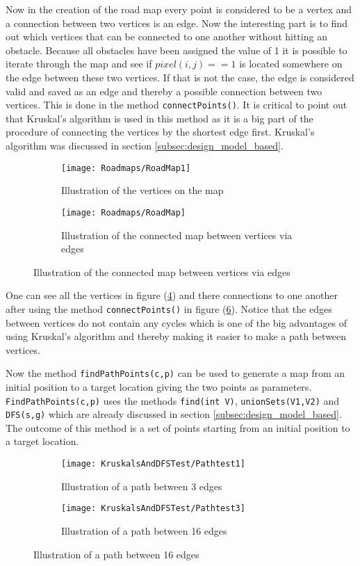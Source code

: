 \documentclass[../Head/Main.tex]{subfiles}
\begin{document}
Now in the creation of the road map every point is considered to be a vertex and a connection between two vertices is an edge. Now the interesting part is to find out which vertices that can be connected to one another without hitting an obstacle. Because all obstacles have been assigned the value of 1 it is possible to iterate through the map and see if $pixel(i,j) == 1$ is located somewhere on the edge between these two vertices. If that is not the case, the edge is considered valid and saved as an edge and thereby a possible connection between two vertices. This is done in the method \texttt{connectPoints()}. It is critical to point out that Kruskal's algorithm is used in this method as it is a big part of the procedure of connecting the vertices by the shortest edge first. Kruskal's algorithm was discussed in section \ref{subsec:design_model_based}.

  \begin{figure}[H]
   \begin{subfigure}[b]{0.49\textwidth}
    \centering
    \texttt{[image: Roadmaps/RoadMap1]}
    \caption{Illustration of the vertices on the map}
    \label{fig:Vertexes}
  \end{subfigure}
  \hfill
   \begin{subfigure}[b]{0.49\textwidth}
    \centering
    \texttt{[image: Roadmaps/RoadMap]}
    \caption{Illustration of the connected map between vertices via edges}
    \label{fig:VertexesAndEdges}
  \end{subfigure}
  \end{figure}  
  
One can see all the vertices in figure (\ref{fig:Vertexes}) and there connections to one another after using the method \texttt{connectPoints()} in figure (\ref{fig:VertexesAndEdges}). Notice that the edges between vertices do not contain any cycles which is one of the big advantages of using Kruskal's algorithm and thereby making it easier to make a path between vertices.  

Now the method \texttt{findPathPoints(c,p)} can be used to generate a map from an initial position to a target location giving the two points as parameters. \texttt{FindPathPoints(c,p)} uses the methods \texttt{find(int V)}, \texttt{unionSets(V1,V2)} and \texttt{DFS(s,g)} which are already discussed in section \ref{subsec:design_model_based}. The outcome of this method is a set of points starting from an initial position to a target location.
  \begin{figure}[H]
   \begin{subfigure}[b]{0.49\textwidth}
    \centering
    \texttt{[image: KruskalsAndDFSTest/Pathtest1]}
    \caption{Illustration of a path between 3 edges}
    \label{fig:Vertexes}
  \end{subfigure}
  \hfill
   \begin{subfigure}[b]{0.49\textwidth}
    \centering
    \texttt{[image: KruskalsAndDFSTest/Pathtest3]}
    \caption{Illustration of a path between 16 edges}
    \label{fig:VertexesAndEdges}
  \end{subfigure}
  \end{figure}  
\end{document}
